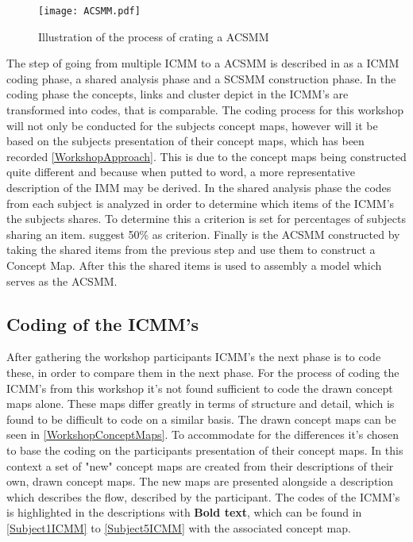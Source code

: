 \begin{figure}[H]
	\centering
	\texttt{[image: ACSMM.pdf]}
	\caption{Illustration of the process of crating a ACSMM}
	\label{fig:ACSMM}
\end{figure}

The step of going from multiple ICMM to a ACSMM is described in \textcite{WEB:ConceptMapAnalysis} as a ICMM coding phase, a shared analysis phase and a SCSMM construction phase. In the coding phase the concepts, links and cluster depict in the ICMM's are transformed into codes, that is comparable. The coding process for this workshop will not only be conducted for the subjects concept maps, however will it be based on the subjects presentation of their concept maps, which has been recorded \autoref{WorkshopApproach}. This is due to the concept maps being constructed quite different and because when putted to word, a more representative description of the IMM may be derived. In the shared analysis phase the codes from each subject is analyzed in order to determine which items of the ICMM's the subjects shares. To determine this a criterion is set for percentages of subjects sharing an item. \textcite{WEB:ConceptMapAnalysis} suggest 50\% as criterion. Finally is the ACSMM constructed by taking the shared items from the previous step and use them to construct a Concept Map. After this the shared items is used to assembly a model which serves as the ACSMM. 


\subsection{Coding of the ICMM's}
\label{ICMMCoding}
After gathering the workshop participants ICMM's the next phase is to code these, in order to compare them in the next phase. For the process of coding the ICMM's from this workshop it's not found sufficient to code the drawn concept maps alone. These maps differ greatly in terms of structure and detail, which is found to be difficult to code on a similar basis. The drawn concept maps can be seen in \autoref{WorkshopConceptMaps}. To accommodate for the differences it's chosen to base the coding on the participants presentation of their concept maps. In this context a set of "new" concept maps are created from their descriptions of their own, drawn concept maps. The new maps are presented alongside a description which describes the flow, described by the participant. The codes of the ICMM's is highlighted in the descriptions with \textbf{Bold text}, which can be found in \autoref{Subject1ICMM} to \autoref{Subject5ICMM} with the associated concept map. 

